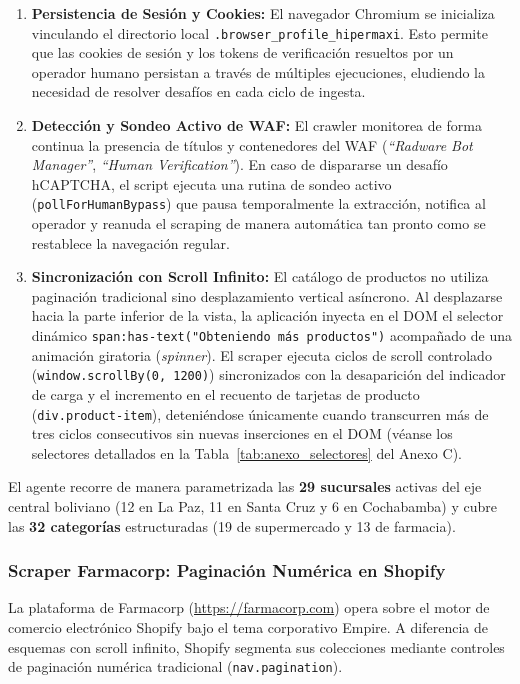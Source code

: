 \begin{enumerate}[leftmargin=*]
    \item \textbf{Persistencia de Sesión y Cookies:} El navegador Chromium se inicializa vinculando el directorio local \texttt{.browser\_profile\_hipermaxi}. Esto permite que las cookies de sesión y los tokens de verificación resueltos por un operador humano persistan a través de múltiples ejecuciones, eludiendo la necesidad de resolver desafíos en cada ciclo de ingesta.
    \item \textbf{Detección y Sondeo Activo de WAF:} El crawler monitorea de forma continua la presencia de títulos y contenedores del WAF (\textit{``Radware Bot Manager''}, \textit{``Human Verification''}). En caso de dispararse un desafío hCAPTCHA, el script ejecuta una rutina de sondeo activo (\texttt{pollForHumanBypass}) que pausa temporalmente la extracción, notifica al operador y reanuda el scraping de manera automática tan pronto como se restablece la navegación regular.
    \item \textbf{Sincronización con Scroll Infinito:} El catálogo de productos no utiliza paginación tradicional sino desplazamiento vertical asíncrono. Al desplazarse hacia la parte inferior de la vista, la aplicación inyecta en el DOM el selector dinámico \texttt{span:has-text("Obteniendo más productos")} acompañado de una animación giratoria (\textit{spinner}). El scraper ejecuta ciclos de scroll controlado (\texttt{window.scrollBy(0, 1200)}) sincronizados con la desaparición del indicador de carga y el incremento en el recuento de tarjetas de producto (\texttt{div.product-item}), deteniéndose únicamente cuando transcurren más de tres ciclos consecutivos sin nuevas inserciones en el DOM (véanse los selectores detallados en la Tabla~\ref{tab:anexo_selectores} del Anexo C).
\end{enumerate}

El agente recorre de manera parametrizada las \textbf{29 sucursales} activas del eje central boliviano (12 en La Paz, 11 en Santa Cruz y 6 en Cochabamba) y cubre las \textbf{32 categorías} estructuradas (19 de supermercado y 13 de farmacia).

\subsubsection{Scraper Farmacorp: Paginación Numérica en Shopify}
La plataforma de Farmacorp (\url{https://farmacorp.com}) opera sobre el motor de comercio electrónico Shopify bajo el tema corporativo Empire. A diferencia de esquemas con scroll infinito, Shopify segmenta sus colecciones mediante controles de paginación numérica tradicional (\texttt{nav.pagination}).

